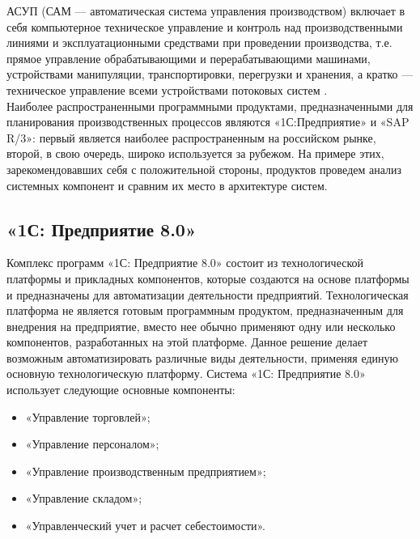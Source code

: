 \indent АСУП (САМ — автоматическая система управления производством) включает в себя компьютерное техническое управление и контроль над производственными линиями и эксплуатационными средствами при проведении производства, т.е. прямое управление обрабатывающими и перерабатывающими машинами, устройствами манипуляции, транспортировки, перегрузки и хранения, а кратко — техническое управление всеми устройствами потоковых систем \cite{gibBook}.\\
\indent Наиболее распространенными программными продуктами, предназначенными для планирования производственных процессов являются «1С:Предприятие» и «SAP R/3»: первый является наиболее распространенным на российском рынке, второй, в свою очередь, широко используется за рубежом. 
На примере этих, зарекомендовавших себя с положительной стороны, продуктов проведем анализ системных компонент и сравним их место в архитектуре систем.

\subsection{«1С: Предприятие 8.0»}

\indent Комплекс программ «1С: Предприятие 8.0» состоит из технологической платформы и прикладных компонентов, которые создаются на основе платформы и предназначены для автоматизации деятельности предприятий. 
Технологическая платформа не является готовым программным продуктом, предназначенным для внедрения на предприятие, вместо нее обычно применяют одну или несколько компонентов, разработанных на этой платформе. 
Данное решение делает возможным автоматизировать различные виды деятельности, применяя единую основную технологическую платформу.
\indent Система «1С: Предприятие 8.0» использует следующие основные компоненты:

\begin{itemize}
	\item «Управление торговлей»;
	\item «Управление персоналом»;
	\item «Управление производственным предприятием»;
	\item «Управление складом»;
	\item «Управленческий учет и расчет себестоимости».
\end{itemize}

